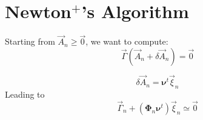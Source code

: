 \documentclass[aps,onecolumn,11pt]{revtex4}
\begin{document}
   
\section{Newton$^+$'s Algorithm}

Starting from $\vec{A}_n\geq\vec{0}$, we want to compute:
\begin{equation}
	\vec{\Gamma}(\vec{A}_n+\delta\vec{A}_n) = \vec{0}
\end{equation}
	
\begin{equation}
	\delta\vec{A}_n = \bm{\nu}^t \vec{\xi}_n
\end{equation}
Leading to
\begin{equation}
	\vec{\Gamma}_n + (\bm{\Phi}_n \bm{\nu}^t ) \vec{\xi}_n \simeq \vec{0}
\end{equation}
 
\end{document}
